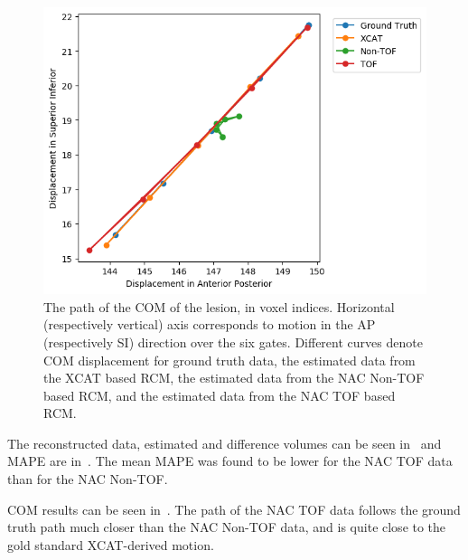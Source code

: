             \begin{figure}
                \centering
                
                \includegraphics[width=1.0\linewidth]{figures/motion_correction_1_results_1_TOF.png}
                
                \captionsetup{singlelinecheck=false}
                \caption{
                    The path of the \gls{COM} of the lesion, in voxel indices. Horizontal (respectively vertical) axis corresponds to motion in the \gls{AP} (respectively \gls{SI}) direction over the six gates. Different curves denote \gls{COM} displacement for ground truth data, the estimated data from the \gls{XCAT} based \gls{RCM}, the estimated data from the \gls{NAC} \gls{Non-TOF} based \gls{RCM}, and the estimated data from the \gls{NAC} \gls{TOF} based \gls{RCM}.
                }
                \label{fig:impact_of_tof_on_respiratory_motion_model_estimation_using_pre_gated_no_intra_cycle_motion_nac_pet_results_com_graph}
            \end{figure}
            
             The reconstructed data, estimated and difference volumes can be seen in~ and \gls{MAPE} are in~. The mean \gls{MAPE} was found to be lower for the \gls{NAC} \gls{TOF} data than for the \gls{NAC} \gls{Non-TOF}.
            
             \gls{COM} results can be seen in~. The path of the \gls{NAC} \gls{TOF} data follows the ground truth path much closer than the \gls{NAC} \gls{Non-TOF} data, and is quite close to the gold standard \gls{XCAT}-derived motion.
            
